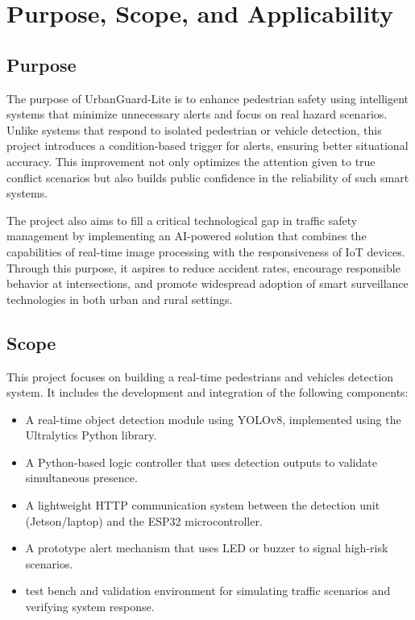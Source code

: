 \documentclass[a4paper, 12pt]{report}
\begin{document}
\section{Purpose, Scope, and Applicability}

\subsection{Purpose}
The purpose of UrbanGuard-Lite is to enhance pedestrian safety using intelligent systems that minimize unnecessary alerts and focus on real hazard scenarios. Unlike systems that respond to isolated pedestrian or vehicle detection, this project introduces a condition-based trigger for alerts, ensuring better situational accuracy. This improvement not only optimizes the attention given to true conflict scenarios but also builds public confidence in the reliability of such smart systems.

The project also aims to fill a critical technological gap in traffic safety management by implementing an AI-powered solution that combines the capabilities of real-time image processing with the responsiveness of IoT devices. Through this purpose, it aspires to reduce accident rates, encourage responsible behavior at intersections, and promote widespread adoption of smart surveillance technologies in both urban and rural settings.


\subsection{Scope}
This project focuses on  building a real-time pedestrians and vehicles detection system. It includes the development and integration of the following components:

\begin{itemize}[itemsep=-4pt]
    \item A real-time object detection module using YOLOv8, implemented using the Ultralytics Python library.

    \item A Python-based logic controller that uses detection outputs to validate simultaneous presence.

    \item  A lightweight HTTP communication system between the detection unit (Jetson/laptop) and the ESP32 microcontroller.

    \item A prototype alert mechanism that uses LED or buzzer to signal high-risk scenarios.
    
    \item  test bench and validation environment for simulating traffic scenarios and verifying system response.
\end{itemize}
\end{document}
